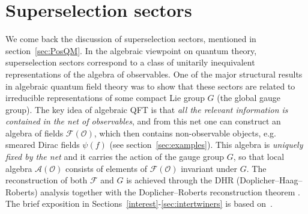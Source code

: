 \documentclass[12pt]{article}
\newcommand{\1}{\mathds{1}}                         %
\newcommand{\F}{\mathcal{F}}
\newcommand{\Ocal}{\mathcal{O}}
\newcommand{\Ac}{{\mathcal{A}}}
\newcommand{\Fc}{{\mathcal{F}}}
\begin{document}
 
 




\section{Superselection sectors}\label{sec:sectors}
We come back the discussion of superselection sectors, mentioned in section~\ref{sec:PosQM}. In the algebraic viewpoint on quantum theory, superselection sectors correspond to a class of unitarily inequivalent representations of the algebra of observables. One of the major structural results in algebraic quantum field theory \cite{DHR1,DHR2,DHR3,DHR4,DR89} was to show that these sectors are related to irreducible representations of some compact Lie group $G$ (the global gauge group). The key idea of algebraic QFT is that \textit{all the relevant information is contained in the net of observables}, and from this net one can construct an algebra of fields $\F(\Ocal)$, which then contains non-observable objects, e.g. smeared Dirac fields $\psi(f)$ (see section~\ref{sec:examples}). This algebra is \textit{uniquely fixed by the net} and it carries the action of the gauge group $G$, so that local algebra $\Ac(\Ocal)$ consists of elements of $\Fc(\Ocal)$ invariant under $G$. The reconstruction of both $\Fc$ and $G$ is achieved through the DHR (Doplicher--Haag--Roberts) analysis \cite{DHR1,DHR2,DHR3,DHR4} together with the Doplicher--Roberts reconstruction theorem \cite{DR89}. The brief exposition in Sections~\ref{interest}-\ref{sec:intertwiners} is based on~\cite{KlausSuperselection}.
\end{document}
